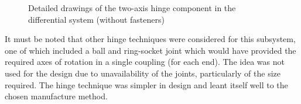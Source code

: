         \begin{figure}[H]
        \centering
        \caption[Detailed drawings of the two-axis hinge component in the differential system (without fasteners)]{Detailed drawings of the two-axis hinge component in the differential system (without fasteners)}
        \label{fig:mechDesign-twoAxisHingeDetail}
        \end{figure}
        
        It must be noted that other hinge techniques were considered for this subsystem, one of which included a ball and ring-socket joint which would have provided the required axes of rotation in a single coupling (for each end). The idea was not used for the design due to unavailability of the joints, particularly of the size required. The hinge technique was simpler in design and leant itself well to the chosen manufacture method.
        
